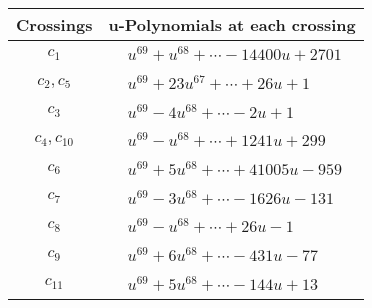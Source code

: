 \documentclass[1p]{elsarticle_modified}
\theoremstyle{definition}
\begin{document}
\begin{tabular}{m{50pt}|m{274pt}}
Crossings & \hspace{64pt}u-Polynomials at each crossing \\
\hline $$\begin{aligned}c_{1}\end{aligned}$$&$\begin{aligned}
&u^{69}+u^{68}+\cdots-14400 u+2701
\end{aligned}$\\
\hline $$\begin{aligned}c_{2},c_{5}\end{aligned}$$&$\begin{aligned}
&u^{69}+23 u^{67}+\cdots+26 u+1
\end{aligned}$\\
\hline $$\begin{aligned}c_{3}\end{aligned}$$&$\begin{aligned}
&u^{69}-4 u^{68}+\cdots-2 u+1
\end{aligned}$\\
\hline $$\begin{aligned}c_{4},c_{10}\end{aligned}$$&$\begin{aligned}
&u^{69}- u^{68}+\cdots+1241 u+299
\end{aligned}$\\
\hline $$\begin{aligned}c_{6}\end{aligned}$$&$\begin{aligned}
&u^{69}+5 u^{68}+\cdots+41005 u-959
\end{aligned}$\\
\hline $$\begin{aligned}c_{7}\end{aligned}$$&$\begin{aligned}
&u^{69}-3 u^{68}+\cdots-1626 u-131
\end{aligned}$\\
\hline $$\begin{aligned}c_{8}\end{aligned}$$&$\begin{aligned}
&u^{69}- u^{68}+\cdots+26 u-1
\end{aligned}$\\
\hline $$\begin{aligned}c_{9}\end{aligned}$$&$\begin{aligned}
&u^{69}+6 u^{68}+\cdots-431 u-77
\end{aligned}$\\
\hline $$\begin{aligned}c_{11}\end{aligned}$$&$\begin{aligned}
&u^{69}+5 u^{68}+\cdots-144 u+13
\end{aligned}$\\
\hline
\end{tabular}\\~\\
\end{document}
